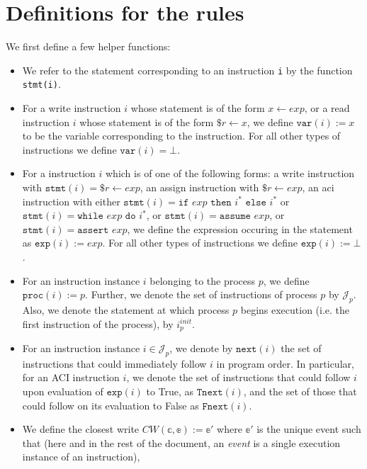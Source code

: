 \documentclass{article}
\begin{document}
\section{Definitions for the rules}
We first define a few helper functions:
\begin{itemize}
    \setlength\itemsep{0em}
    \item We refer to the statement corresponding to an instruction \texttt{i} by the function \texttt{stmt(i)}.
    \item For a write instruction $i$ whose statement is of the form $x \leftarrow exp$, or a read instruction $i$ whose statement is of the form $\$r \leftarrow x$, we define $\texttt{var}(i) := x$ to be the variable corresponding to the instruction. For all other types of instructions we define $\texttt{var}(i) = \bot$.
    \item For a instruction $i$ which is of one of the following forms: a write instruction with $\texttt{stmt}(i) = \$r \leftarrow exp$, an assign instruction with $\$r \leftarrow exp$, an aci instruction with either $\texttt{stmt}(i) = \texttt{if } exp \texttt{ then }i^* \texttt{ else }i^*$ or $\texttt{stmt}(i) = \texttt{while } exp \texttt{ do }i^*$, or $\texttt{stmt}(i) = \texttt{assume } exp$, or $\texttt{stmt}(i) = \texttt{assert } exp$, we define the expression occuring in the statement as $\texttt{exp}(i) := exp$. For all other types of instructions we define $\texttt{exp}(i) := \bot$.
    \item For an instruction instance $i$ belonging to the process $p$, we define $\texttt{proc}(i) := p$. Further, we denote the set of instructions of process $p$ by $\mathcal{J}_p$. Also, we denote the statement at which process $p$ begins execution (i.e. the first instruction of the process), by $i_p^{init}$.
    \item For an instruction instance $i \in \mathcal{J}_p$, we denote by $\texttt{next}(i)$ the set of instructions that could immediately follow $i$ in program order. In particular, for an ACI instruction $i$, we denote the set of instructions that could follow $i$ upon evaluation of $\texttt{exp}(i)$ to True, as $\texttt{Tnext}(i)$, and the set of those that could follow on its evaluation to False as $\texttt{Fnext}(i)$.
    \item We define the closest write $CW(\mathbb{c},\mathbb{e}) := \mathbb{e}'$ where $\mathbb{e}'$ is the unique event such that (here and in the rest of the document, an \textit{event} is a single execution instance of an instruction),
    \begin{enumerate}

\end{enumerate}
\end{itemize}
\end{document}
